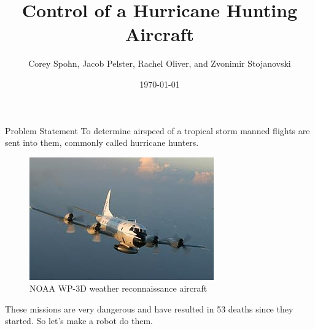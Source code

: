 \documentclass[aspectratio=169]{beamer}
\begin{document}

\title[Your Short Title]{Control of a Hurricane Hunting Aircraft}
\author{Corey Spohn, Jacob Pelster, Rachel Oliver, and Zvonimir Stojanovski}
\date{\today}

\begin{frame}
  \titlepage
\end{frame}

\begin{frame}{Problem Statement}
    To determine airspeed of a tropical storm manned flights are sent into them, commonly called hurricane hunters.
    \begin{figure}
        \centering
        \includegraphics[scale = .75]{300px-Lockheed_WP-3D_Orion.jpg}
        \caption{NOAA WP-3D weather reconnaissance aircraft}
        \label{fig:my_label}
    \end{figure}
    These missions are very dangerous and have resulted in 53 deaths since they started. So let's make a robot do them.
\end{frame}
\end{document}
